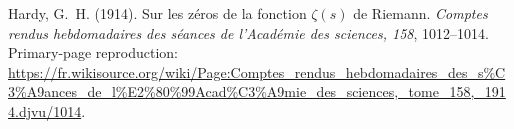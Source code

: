 Hardy, G.~H. (1914). Sur les z\'eros de la fonction
$\zeta(s)$ de Riemann. \emph{Comptes rendus
hebdomadaires des s\'eances de l'Acad\'emie
des sciences, 158}, 1012--1014.
Primary-page reproduction:
\url{https://fr.wikisource.org/wiki/Page:Comptes_rendus_hebdomadaires_des_s\%C3\%A9ances_de_l\%E2\%80\%99Acad\%C3\%A9mie_des_sciences,_tome_158,_1914.djvu/1014}.
